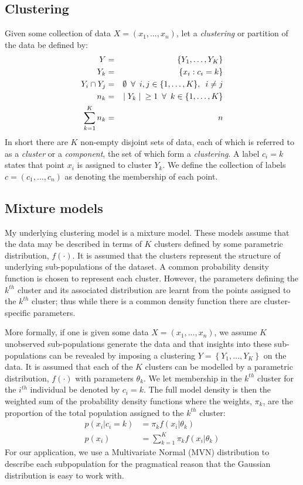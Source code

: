 \documentclass[12pt]{article} %
\begin{document}
	\subsection{Clustering} \label{sec:clustering}
	Given some collection of data $X=\left(x_1,\ldots,x_n\right)$, let a \emph{clustering} or partition of the data be defined by:
	\begin{eqnarray}
	Y &=& \left\{Y_1,\ldots,Y_K\right\} \\
	Y_k &=& \left\{x_i : c_i = k \right\}  \\
	Y_i \cap Y_j &=& \emptyset \enskip \forall \enskip i,j \in \{1,\ldots,K\}, \enskip i \neq j \\
	n_k & = & \mid Y_k \mid \enskip \geq 1 \enskip \forall \enskip k \in \{1,\ldots,K\} \\
	\sum_{k=1}^Kn_k &=& n
	\end{eqnarray}
	In short there are $K$ non-empty disjoint sets of data, each of which is referred to as a \emph{cluster} or a \emph{component}, the set of which form a \emph{clustering}. A label $c_i=k$ states that point $x_i$ is assigned to cluster $Y_k$. We define the collection of labels $c=(c_1,\ldots,c_n)$ as denoting the membership of each point.
	
	\subsection{Mixture models} \label{sec:theory:sub_sec:mixture_models}
	My underlying clustering model is a mixture model. These models assume that the data may be described in terms of $K$ clusters defined by some parametric distribution, $f(\cdot)$. It is assumed that the clusters represent the structure of underlying sub-populations of the dataset. A common probability density function is chosen to represent each cluster. However, the parameters defining the $k^{th}$ cluster and its associated distribution are learnt from the points assigned to the $k^{th}$ cluster; thus while there is a common density function there are cluster-specific parameters.
	
	More formally, if one is given some data $X = (x_1, \ldots, x_n)$, we assume $K$ unobserved sub-populations generate the data and that insights into these sub-populations can be revealed by imposing a clustering $Y = \left\{Y_1,\ldots,Y_K\right\}$ on the data. It is assumed that each of the $K$ clusters can be modelled by a parametric distribution, $f(\cdot)$ with parameters $\theta_k$. We let membership in the $k^{th}$ cluster for the $i^{th}$ individual be denoted by $c_i = k$. The full model density is then the weighted sum of the probability density functions where the weights, $\pi_k$, are the proportion of the total population assigned to the $k^{th}$ cluster:
	\begin{align}
	p(x_i|c_i = k) &= \pi_k f(x_i | \theta_k) \\
	p(x_i) &= \sum_{k=1}^K \pi_k f(x_i | \theta_k)
	\end{align}
	For our application, we use a Multivariate Normal (MVN) distribution to describe each subpopulation for the pragmatical reason that the Gaussian distribution is easy to work with.
	
\end{document}
